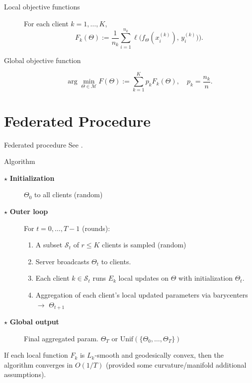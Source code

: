 \documentclass[aspectratio=169,xcolor=dvipsnames]{beamer}
\begin{document}
\begin{frame}
\begin{description}
    \item[Local objective functions] For each client $k=1,\dots, K$,
    $$F_k(\Theta):=\frac{1}{n_k}\sum_{i=1}^{n_k}\ell\bigl(f_{\Theta}(x_i^{(k)}),\,y_i^{(k)})\bigr).$$
    \item[Global objective function]
    $$\arg \min_{\Theta \in \mathcal{M}}F(\Theta):=\sum_{k=1}^{K}p_kF_k(\Theta),\quad p_k=\frac{n_k}{n}.$$
\end{description}
\end{frame}

\section{Federated Procedure}

\begin{frame}{Federated procedure}
See \cite{li2022federated}.
\begin{block}{Algorithm}
\begin{description}
    \item[$\star$ \textbf{Initialization}] $\Theta_{0}$ to all clients (random)
    \item[$\star$ \textbf{Outer loop}] For $t=0,\dots, T-1$ (rounds):
    \begin{enumerate}
        \item A subset $\mathcal{S}_t$ of $r\leq K$ clients is sampled (random)
        \item Server broadcasts $\Theta_{t}$ to clients.
        \item Each client $k\in \mathcal{S}_t$ runs $E_k$ local updates on $\Theta$ with initialization $\Theta_{t}$.
        \item Aggregation of each client's local updated parameters via barycenters $\to$ $\Theta_{t+1}$
    \end{enumerate}
    \item[$\star$ \textbf{Global output}] Final aggregated param. $\Theta_{T}$ or $\text{Unif}(\{\Theta_{0},\dots,\Theta_{T}\})$
\end{description}
\end{block}
\vspace{0.5cm}
If each local function $F_k$ is $L_k$-smooth and geodesically convex, then the algorithm converges in $O(1/T)$ (provided some curvature/manifold additional assumptions).
\end{frame}
\end{document}
